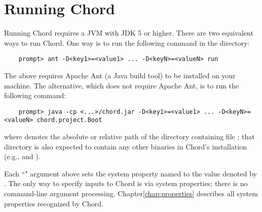 \section{Running Chord}
\label{sec:running-chord}

Running Chord requires a JVM with JDK 5 or higher.
There are two equivalent ways to run Chord.
One way is to run the following command in the  directory:

\begin{verbatim}
    prompt> ant -D<key1>=<value1> ... -D<keyN>=<valueN> run
\end{verbatim}

The above requires Apache Ant (a Java build tool) to be installed on your machine.  The alternative, which
does not require Apache Ant, is to run the following command:

\begin{verbatim}
    prompt> java -cp <...>/chord.jar -D<key1>=<value1> ... -D<keyN>=<valueN> chord.project.Boot
\end{verbatim}

where  denotes the absolute or relative path of the directory containing file ;
that directory is also expected to contain any other binaries in Chord's installation
(e.g.,  and ).

Each ``" argument above sets the system property named  to
the value denoted by .  The only way to specify inputs to Chord is via system properties; there is no
command-line argument processing.
Chapter\ref{chap:properties} describes all system properties recognized by Chord.

